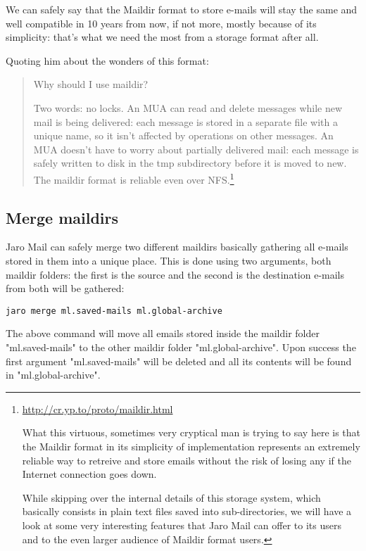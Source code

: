 \documentclass[a4,onecolumn,portrait]{article}
\begin{document}
We can safely say that the Maildir format to store e-mails will stay
the same and well compatible in 10 years from now, if not more, mostly
because of its simplicity: that's what we need the most from a storage
format after all.

Quoting him about the wonders of this format:

\begin{quote}


Why should I use maildir?

Two words: no locks. An MUA can read and delete messages while new
mail is being delivered: each message is stored in a separate file
with a unique name, so it isn't affected by operations on other
messages. An MUA doesn't have to worry about partially delivered mail:
each message is safely written to disk in the tmp subdirectory before
it is moved to new. The maildir format is reliable even over NFS.\footnote{\url{http://cr.yp.to/proto/maildir.html}

What this virtuous, sometimes very cryptical man is trying to say here
is that the Maildir format in its simplicity of implementation
represents an extremely reliable way to retreive and store emails
without the risk of losing any if the Internet connection goes down.

While skipping over the internal details of this storage system, which
basically consists in plain text files saved into sub-directories, we
will have a look at some very interesting features that Jaro Mail can
offer to its users and to the even larger audience of Maildir format
users.}
\end{quote}

\subsection{Merge maildirs}
\label{sec-10-1}

Jaro Mail can safely merge two different maildirs basically gathering all e-mails stored in them into a unique place. This is done using two arguments, both maildir folders: the first is the source and the second is the destination e-mails from both will be gathered:

\begin{verbatim}
jaro merge ml.saved-mails ml.global-archive
\end{verbatim}

The above command will move all emails stored inside the maildir folder "ml.saved-mails" to the other maildir folder "ml.global-archive". Upon success the first argument "ml.saved-mails" will be deleted and all its contents will be found in "ml.global-archive".
\end{document}
